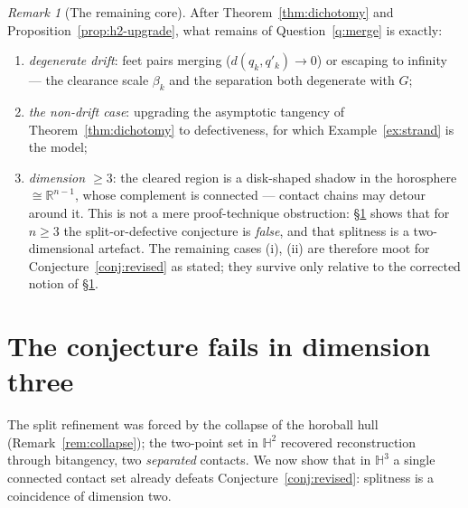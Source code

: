 \documentclass[11pt]{article}
\theoremstyle{remark}
\newtheorem{remark}[theorem]{Remark}
\newcommand{\R}{\mathbb{R}}
\begin{document}
\begin{remark}[The remaining core]\label{rem:core}
After Theorem~\ref{thm:dichotomy} and
Proposition~\ref{prop:h2-upgrade}, what remains of
Question~\ref{q:merge} is exactly:
\begin{enumerate}[label=(\roman*)]
\item \emph{degenerate drift}: feet pairs merging
($d(q_{k},q'_{k})\to0$) or escaping to infinity --- the clearance
scale $\beta_{k}$ and the separation both degenerate with $G$;
\item \emph{the non-drift case}: upgrading the asymptotic tangency of
Theorem~\ref{thm:dichotomy} to defectiveness, for which
Example~\ref{ex:strand} is the model;
\item \emph{dimension $\ge3$}: the cleared region is a disk-shaped
shadow in the horosphere $\cong\R^{n-1}$, whose complement is
connected --- contact chains may detour around it. This is not a
mere proof-technique obstruction: \S\ref{sec:dim3} shows that for
$n\ge3$ the split-or-defective conjecture is \emph{false}, and that
splitness is a two-dimensional artefact. The remaining cases (i),
(ii) are therefore moot for Conjecture~\ref{conj:revised} as stated;
they survive only relative to the corrected notion of
\S\ref{sec:dim3}.
\end{enumerate}
\end{remark}

\section{The conjecture fails in dimension three}\label{sec:dim3}

The split refinement was forced by the collapse of the horoball hull
(Remark~\ref{rem:collapse}); the two-point set in $\mathbb{H}^{2}$
recovered reconstruction through bitangency, two \emph{separated}
contacts. We now show that in $\mathbb{H}^{3}$ a single connected
contact set already defeats Conjecture~\ref{conj:revised}: splitness
is a coincidence of dimension two.
\end{document}
